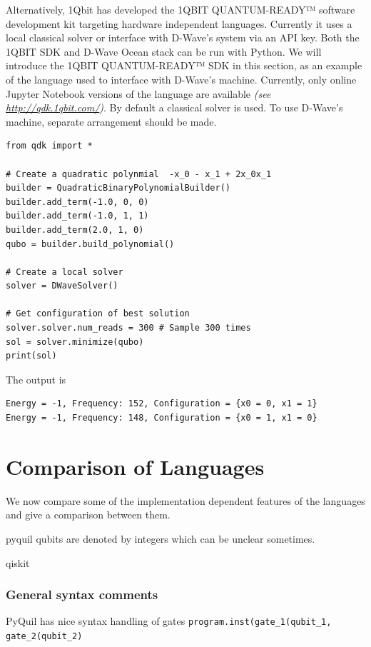 Alternatively, 1Qbit has developed the 1QBIT QUANTUM-READY™ software development kit targeting hardware independent languages. Currently it uses a local classical solver or interface with D-Wave's system via an API key. Both the 1QBIT SDK and D-Wave Ocean stack can be run with Python.
We will introduce the 1QBIT QUANTUM-READY™ SDK in this section, as an example of the language used to interface with D-Wave's machine. Currently, only online Jupyter Notebook versions of the language are available \textit{(see \url{http://qdk.1qbit.com/})}.
By default a classical solver is used. To use D-Wave's machine, separate arrangement should be made.\\
\begin{verbatim}
from qdk import *

# Create a quadratic polynmial  -x_0 - x_1 + 2x_0x_1  
builder = QuadraticBinaryPolynomialBuilder() 
builder.add_term(-1.0, 0, 0) 
builder.add_term(-1.0, 1, 1) 
builder.add_term(2.0, 1, 0)  
qubo = builder.build_polynomial()

# Create a local solver 
solver = DWaveSolver()

# Get configuration of best solution 
solver.solver.num_reads = 300 # Sample 300 times
sol = solver.minimize(qubo)
print(sol) 
\end{verbatim}
The output is
\begin{verbatim}
Energy = -1, Frequency: 152, Configuration = {x0 = 0, x1 = 1}
Energy = -1, Frequency: 148, Configuration = {x0 = 1, x1 = 0}
\end{verbatim}

\section{Comparison of Languages}

We now compare some of the implementation dependent features of the languages and give a comparison between them.

pyquil
qubits are denoted by integers which can be unclear sometimes.

qiskit 
\subsubsection{General syntax comments}


PyQuil has nice syntax handling of gates \texttt{program.inst(gate\_1(qubit\_1, gate\_2(qubit\_2)}


